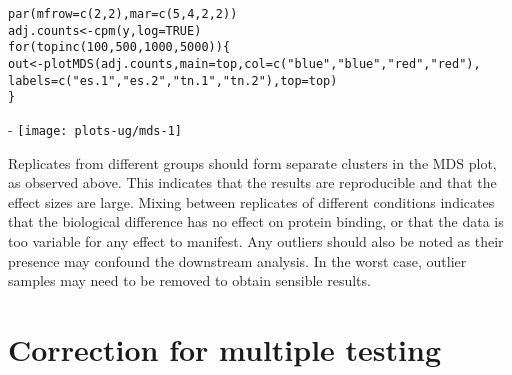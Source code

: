 \documentclass{report}\usepackage[]{graphicx}\usepackage[usenames,dvipsnames]{color}
\makeatletter
\def\maxwidth{ %
  \ifdim\Gin@nat@width>\linewidth
    \linewidth
  \else
    \Gin@nat@width
  \fi
}
\newcommand{\hlnum}[1]{\textcolor[rgb]{0.816,0.125,0.439}{#1}}%
\newcommand{\hlstr}[1]{\textcolor[rgb]{0.251,0.627,0.251}{#1}}%
\newcommand{\hlstd}[1]{\textcolor[rgb]{0.251,0.251,0.251}{#1}}%
\newcommand{\hlkwa}[1]{\textcolor[rgb]{0.125,0.125,0.941}{#1}}%
\newcommand{\hlkwb}[1]{\textcolor[rgb]{0,0,0}{#1}}%
\newcommand{\hlkwc}[1]{\textcolor[rgb]{0.251,0.251,0.251}{#1}}%
\newcommand{\hlkwd}[1]{\textcolor[rgb]{0.878,0.439,0.125}{#1}}%
\newenvironment{knitrout}{}{} %
\makeatother
\begin{document}
\begin{knitrout}
\color{fgcolor}\begin{kframe}
\begin{alltt}
\hlkwd{par}\hlstd{(}\hlkwc{mfrow}\hlstd{=}\hlkwd{c}\hlstd{(}\hlnum{2}\hlstd{,}\hlnum{2}\hlstd{),} \hlkwc{mar}\hlstd{=}\hlkwd{c}\hlstd{(}\hlnum{5}\hlstd{,}\hlnum{4}\hlstd{,}\hlnum{2}\hlstd{,}\hlnum{2}\hlstd{))}
\hlstd{adj.counts} \hlkwb{<-} \hlkwd{cpm}\hlstd{(y,} \hlkwc{log}\hlstd{=}\hlnum{TRUE}\hlstd{)}
\hlkwa{for} \hlstd{(top} \hlkwa{in} \hlkwd{c}\hlstd{(}\hlnum{100}\hlstd{,} \hlnum{500}\hlstd{,} \hlnum{1000}\hlstd{,} \hlnum{5000}\hlstd{)) \{}
    \hlstd{out} \hlkwb{<-} \hlkwd{plotMDS}\hlstd{(adj.counts,} \hlkwc{main}\hlstd{=top,} \hlkwc{col}\hlstd{=}\hlkwd{c}\hlstd{(}\hlstr{"blue"}\hlstd{,} \hlstr{"blue"}\hlstd{,} \hlstr{"red"}\hlstd{,} \hlstr{"red"}\hlstd{),}
                   \hlkwc{labels}\hlstd{=}\hlkwd{c}\hlstd{(}\hlstr{"es.1"}\hlstd{,} \hlstr{"es.2"}\hlstd{,} \hlstr{"tn.1"}\hlstd{,} \hlstr{"tn.2"}\hlstd{),} \hlkwc{top}\hlstd{=top)}
\hlstd{\}}
\end{alltt}
\end{kframe}\begin{adjustwidth}{0mm}{-\fltoffset}
\texttt{[image: plots-ug/mds-1]} \end{adjustwidth}
\end{knitrout}

Replicates from different groups should form separate clusters in the MDS plot, as observed above.
This indicates that the results are reproducible and that the effect sizes are large.
Mixing between replicates of different conditions indicates that the biological difference has no effect on protein binding, or that the data is too variable for any effect to manifest.
Any outliers should also be noted as their presence may confound the downstream analysis.
In the worst case, outlier samples may need to be removed to obtain sensible results.




\chapter{Correction for multiple testing}
\end{document}
